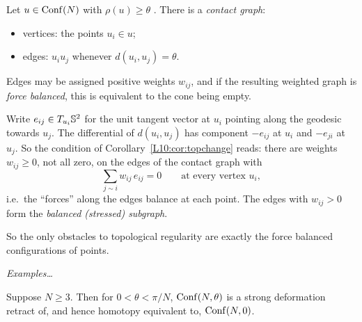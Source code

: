 Let $u\in\operatorname{Conf}(N)$ with $\rho(u)\ge\theta$ . There is a
\emph{contact graph}:
\begin{itemize}[nosep]
  \item vertices: the points $u_i\in u$;
  \item edges: $u_iu_j$ whenever $d(u_i,u_j)=\theta$.
\end{itemize}
Edges may be assigned positive weights $w_{ij}$, and if the resulting weighted graph is
\emph{force balanced}, this is equivalent to the cone being empty.
\begin{addedblock}
Write $e_{ij}\in T_{u_i}\mathbb{S}^2$ for the unit tangent vector at $u_i$ pointing along the geodesic
towards $u_j$. The differential of $d(u_i,u_j)$ has component $-e_{ij}$ at $u_i$ and $-e_{ji}$ at
$u_j$. So the condition of Corollary~\ref{L10:cor:topchange} reads: there are weights $w_{ij}\ge0$,
not all zero, on the edges of the contact graph with
\[
  \sum_{j\sim i} w_{ij}\,e_{ij}=0\qquad\text{at every vertex } u_i ,
\]
i.e.\ the ``forces'' along the edges balance at each point. The edges with $w_{ij}>0$ form the
\emph{balanced (stressed) subgraph}.
\end{addedblock}

So the only obstacles to topological regularity are exactly the force balanced configurations of
points.

\emph{Examples\dots}

\begin{definition}
\label{L10:def:conftheta}
\end{definition}

\begin{theorem}
\label{L10:thm:smalltheta}
Suppose $N\ge3$.
Then for $0<\theta<\pi/N$, $\operatorname{Conf}(N,\theta)$ is a strong deformation retract of, and hence homotopy
equivalent to, $\operatorname{Conf}(N,0)$.
\end{theorem}

